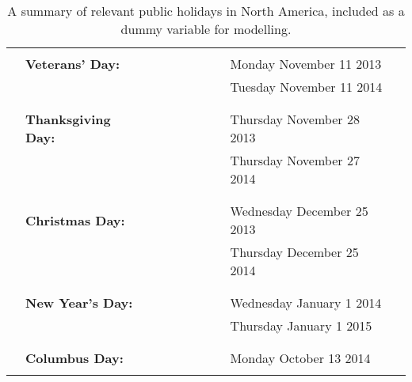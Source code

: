 \documentclass{article}
\begin{document}
\begin{table}
\begin{tabular}{llllllllll}
\hline
 &  &  &  &  &  &  &  &  & \\
 & \textbf{Veterans' Day:} &  &  &  &  &  &  & Monday November 11 2013 & \\
 &  &  &  &  &  &  &  & Tuesday November 11 2014 & \\
 &  &  &  &  &  &  &  &  & \\
\hline
 &  &  &  &  &  &  &  &  & \\
 & \textbf{Thanksgiving Day:} &  &  &  &  &  &  & Thursday November 28 2013 & \\
 &  &  &  &  &  &  &  & Thursday November 27 2014 & \\
 &  &  &  &  &  &  &  &  & \\
\hline
 &  &  &  &  &  &  &  &  & \\
 & \textbf{Christmas Day:} &  &  &  &  &  &  & Wednesday December 25 2013 & \\
 &  &  &  &  &  &  &  & Thursday December 25 2014 & \\
 &  &  &  &  &  &  &  &  & \\
\hline
 &  &  &  &  &  &  &  &  & \\
 & \textbf{New Year's Day:} &  &  &  &  &  &  & Wednesday January 1 2014 & \\
 &  &  &  &  &  &  &  & Thursday January 1 2015 & \\
 &  &  &  &  &  &  &  &  & \\
\hline
 &  &  &  &  &  &  &  &  & \\
 & \textbf{Columbus Day:} &  &  &  &  &  &  & Monday October 13 2014 & \\
 &  &  &  &  &  &  &  &  & \\
\hline
\end{tabular}\caption{\label{tab:public-holidays}A summary of relevant public holidays in North America, included as a dummy variable for modelling.}

\end{table}

\pagebreak
\end{document}
